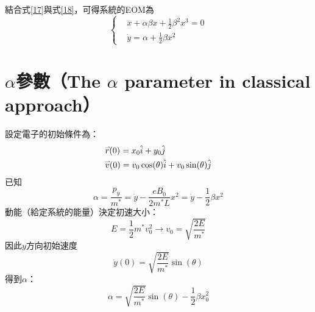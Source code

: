 \documentclass[12pt]{article}
\newcommand{\hvec}[1]{\accentset{\rightharpoonup}{#1}}
\begin{document}
\newpage
\noindent
結合式\eqref{17}與式\eqref{18}，可得系統的EOM為{\color{red}
\begin{equation}
    \left\{
    \begin{aligned}
        &\ddot{x}+\alpha\beta x+\frac12\beta^2x^3=0 \\
        &\dot{y}=\alpha+\frac12\beta x^2
    \end{aligned}
    \right.\label{20}
\end{equation}
}
\section{\texorpdfstring{$\alpha$}{alpha}參數（The \texorpdfstring{$\alpha$}{alpha} parameter in classical approach）}
設定電子的初始條件為：
\begin{align}
    &\hvec{r}(0)=x_0\hat{i}+y_0\hat{j} \nonumber\\
    &\hvec{v}(0)=v_0\cos(\theta)\hat{i}+v_0\sin(\theta)\hat{j}
\end{align}
已知
\begin{equation}
    \alpha=\frac{p_y}{m^*}=\dot{y}-\frac{eB_0}{2m^*L}x^2=\dot{y}-\frac12\beta x^2
\end{equation}
動能（給定系統的能量）決定初速大小：
\begin{equation}
    E=\frac12m^*v_0^2\to v_0=\sqrt{\frac{2E}{m^*}}
\end{equation}
因此$y$方向初始速度
\begin{equation}
    \dot{y}(0)=\sqrt{\frac{2E}{m^*}}\sin(\theta)
\end{equation}
得到$\alpha$：
\begin{equation}
    \alpha=\sqrt{\frac{2E}{m^*}}\sin(\theta)-\frac12\beta x_0^2\label{25}
\end{equation}
\end{document}
